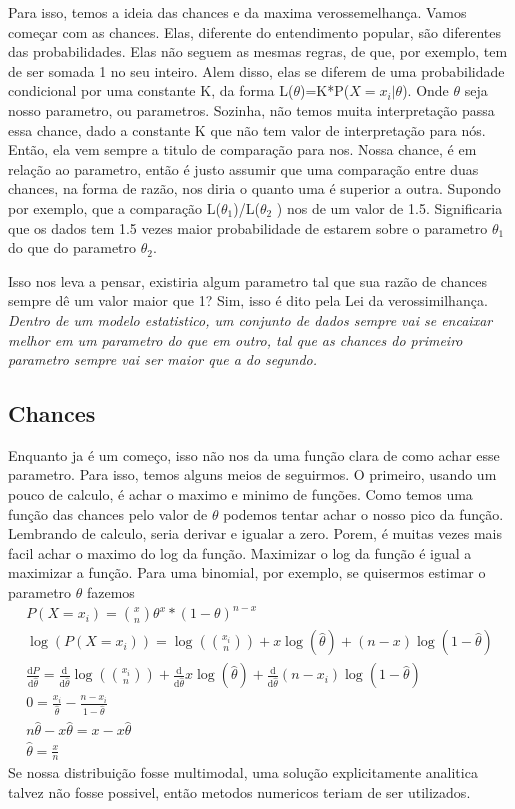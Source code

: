 Para isso, temos a ideia das chances e da maxima verossemelhança. Vamos começar com as chances.
Elas, diferente do entendimento popular, são diferentes das probabilidades. Elas não seguem as
mesmas regras, de que, por exemplo, tem de ser somada 1 no seu inteiro. Alem disso, elas se diferem
de uma probabilidade condicional por uma constante K, da forma L(\(\theta\))=K*P(\(X=x_i|\theta \)).
Onde \(\theta \) seja nosso parametro, ou parametros. Sozinha, não temos muita interpretação passa
essa chance, dado a constante K que não tem valor de interpretação para nós. Então, ela vem sempre a
titulo de comparação para nos. Nossa chance, é em relação ao parametro, então é justo assumir que
uma comparação entre duas chances, na forma de razão, nos diria o quanto uma é superior a outra.
Supondo por exemplo, que a comparação L(\(\theta_1\))/L(\(\theta_2\) ) nos de um valor de 1.5.
Significaria que os dados tem 1.5 vezes maior probabilidade de estarem sobre o parametro
\(\theta_1\) do que do parametro \(\theta _2\).\par

Isso nos leva a pensar, existiria algum parametro tal que sua razão de chances sempre dê um valor
maior que 1? Sim, isso é dito pela Lei da verossimilhança. \textit{Dentro de um modelo estatistico,
um conjunto de dados sempre vai se encaixar melhor em um parametro do que em outro, tal que as
chances do primeiro parametro sempre vai ser maior que a do segundo.}\par
\subsection{Chances}
Enquanto ja é um começo, isso não nos da uma função clara de como achar esse parametro. Para isso,
temos alguns meios de seguirmos. O primeiro, usando um pouco de calculo, é achar o maximo e minimo
de funções. Como temos uma função das chances pelo valor de \(\theta \) podemos tentar achar o nosso
pico da função. Lembrando de calculo, seria derivar e igualar a zero. Porem, é muitas vezes mais
facil achar o maximo do log da função. Maximizar o log da função é igual a maximizar a função. Para
uma binomial, por exemplo, se quisermos estimar o parametro \(\theta \) fazemos
\begin{gather*}
    P(X=x_i)=\binom{x}{n}\theta^x*(1-\theta)^{n-x}\\
    \log (P(X=x_i)) = \log (\binom{x_i}{n}) +x\log (\hat{\theta} )+(n-x)\log (1-\hat{\theta} )\\
    \frac{\mathrm{d}P}{\mathrm{d}\hat{\theta} } =\frac{\mathrm{d}}{\mathrm{d}\hat{\theta} } \log (\binom{x_i}{n})+
    \frac{\mathrm{d}}{\mathrm{d}\hat{\theta} }x\log (\hat{\theta} )+\frac{\mathrm{d}}{\mathrm{d}\hat{\theta} }(n-x_i)\log (1-\hat{\theta})\\
    0=\frac{x_i}{\hat{\theta} }-\frac{n-x_i}{1-\hat{\theta} }\\
    n\hat{\theta}-x\hat{\theta}=x-x\hat{\theta}\\
    \hat{\theta}=\frac{x}{n}
\end{gather*}
Se nossa distribuição fosse multimodal, uma solução explicitamente analitica talvez não fosse
possivel, então metodos numericos teriam de ser utilizados.\par
